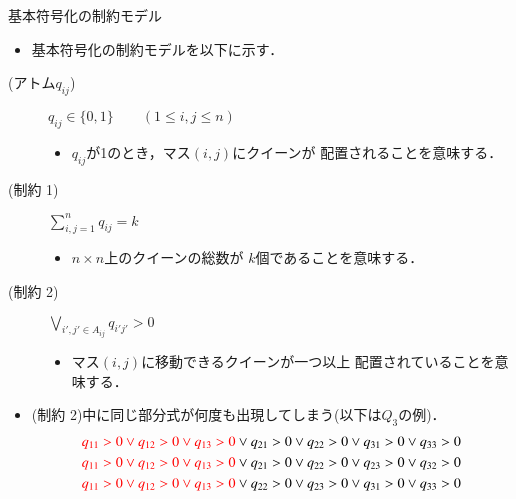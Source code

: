 \begin{frame}{基本符号化の制約モデル}
\begin{itemize}
 \item 基本符号化の制約モデルを以下に示す．
\end{itemize}
 \begin{block}{}
  \begin{description}
   \item[{\color{black} (アトム$q_{ij}$})] 
	      $q_{ij} \in \{0,1\} 
	      \qquad (1 \leq i,j \leq n)$ \par
	      \begin{itemize}
	       \item $q_{ij}$が1のとき，マス$(i,j)$にクイーンが
		     配置されることを意味する．
	      \end{itemize}
   \item[{\color{black}(制約 1)}] 
	      $\sum\limits_{i,j=1}^{n} q_{ij} = k$ \par
	      \begin{itemize}
	       \item $n \times n$上のクイーンの総数が
		     $k$個であることを意味する．
	      \end{itemize}
   \item[{\color{black}(制約 2)}] 
	      $\bigvee\limits_{i',j' \in A_{ij}}q_{i'j'} > 0$ \par
	      \begin{itemize}
	       \item マス$(i,j)$に移動できるクイーンが一つ以上
		     配置されていることを意味する．
	      \end{itemize}
	      
  \end{description}
 \end{block}
 \begin{alertblock}{}
  \begin{itemize}
   \item (制約 2)中に同じ部分式が何度も出現してしまう(以下は$Q_3$の例)．
   \begin{align*}
    {\color{red} q_{11}>0 \vee q_{12}>0 \vee q_{13}>0} 
    \vee q_{21}>0 \vee q_{22}>0 \vee q_{31}>0 \vee q_{33}>0 \\
    {\color{red} q_{11}>0 \vee q_{12}>0 \vee q_{13}>0} 
    \vee q_{21}>0 \vee q_{22}>0 \vee q_{23}>0 \vee q_{32}>0 \\
    {\color{red} q_{11}>0 \vee q_{12}>0 \vee q_{13}>0} 
    \vee q_{22}>0 \vee q_{23}>0 \vee q_{31}>0 \vee q_{33}>0 
   \end{align*}
  \end{itemize}
 \end{alertblock}
\end{frame}

